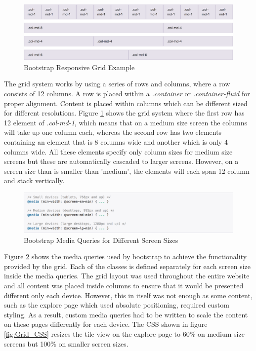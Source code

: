 \begin{figure}[H]
	\centering
	\includegraphics[width=1.0\textwidth]{images/Bootstrap_Grid}
	\caption{Bootstrap Responsive Grid Example} \label{fig:Bootstrap_Grid}
\end{figure}

The grid system works by using a series of rows and columns, where a row consists of 12 columns. A row is placed within a \emph{.container} or \emph{.container-fluid} for proper alignment. Content is placed within columns which can be different sized for different resolutions. Figure \ref{fig:Bootstrap_Grid} shows the grid system where the first row has 12 element of \emph{.col-md-1}, which means that on a medium size screen the columns will take up one column each, whereas the second row has two elements containing an element that is 8 columns wide and another which is only 4 columns wide. All these elements specify only column sizes for medium size screens but these are automatically cascaded to larger screens. However, on a screen size than is smaller than 'medium', the elements will each span 12 column and stack vertically. 

\begin{figure}[H]
	\centering
	\includegraphics[width=1.0\textwidth]{images/Code/Media_Queries}
	\caption{Bootstrap Media Queries for Different Screen Sizes} \label{fig:Media_Queries}
\end{figure}

Figure \ref{fig:Media_Queries} shows the media queries used by bootstrap to achieve the functionality provided by the grid. Each of the classes is defined separately for each screen size inside the media queries. The grid layout was used throughout the entire website and all content was placed inside columns to ensure that it would be presented different only each device. However, this in itself was not enough as some content, such as the explore page which used absolute positioning, required custom styling. As a result, custom media queries had to be written to scale the content on these pages differently for each device. The CSS shown in figure \ref{fig:Grid_CSS} resizes the tile view on the explore page to 60\% on medium size screens but 100\% on smaller screen sizes.

